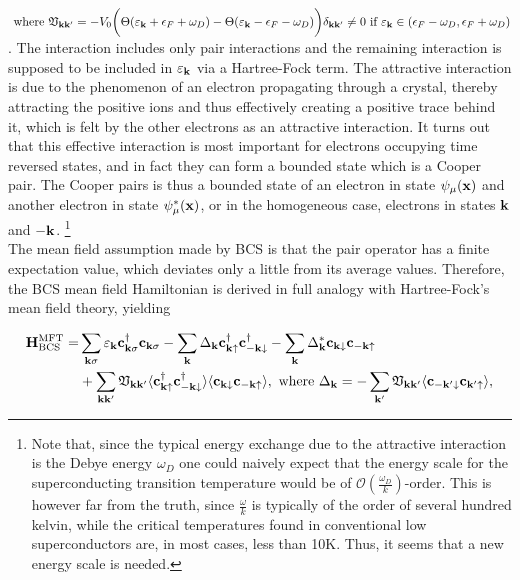 \documentclass{homework}
\begin{document}
$\textnormal{ where } {\mathfrak{V}}_{{\bf k}{\bf k}'} = -V_0 \bigg(\Theta(\varepsilon_{\bf k} + \epsilon_F + \omega_D) - \Theta(\varepsilon_{\bf k} - \epsilon_F - \omega_D)\bigg) \delta_{{\bf k}{\bf k}'} \neq 0 \textnormal{ if }\varepsilon_{{\bf k}} \in (\epsilon_F - \omega_D, \epsilon_F + \omega_D)$. The interaction includes only pair interactions and the remaining interaction is supposed to be included in $\varepsilon_{{\bf k}}$ via a Hartree-Fock term. The attractive interaction is due to the phenomenon of an electron propagating through a crystal, thereby attracting the positive ions and thus effectively creating a positive trace behind it, which is felt by the other electrons as an attractive interaction. It turns out that this effective interaction is most important for electrons occupying time reversed states, and in fact they can form a bounded state which is a Cooper pair. The Cooper pairs is thus a bounded state of an electron in state $\psi_{\mu}({\bf x})$ and another electron in state $\psi_{\mu}^*({\bf x})$, or in the homogeneous case, electrons in states ${\bf k}$ and ${\bf -k}$. \footnote{Note that, since the typical energy exchange due to the attractive interaction is the Debye energy $\omega_D$ one could naively expect that the energy scale for the superconducting transition temperature would be of $\mathcal{O}(\frac{\omega_D}{k})$-order. This is however far from the truth, since $\frac{\omega}{k}$ is typically of the order of several hundred kelvin, while the critical temperatures found in conventional low superconductors are, in most cases, less than 10K. Thus, it seems that a new energy scale is needed. }\\ 

The mean field assumption made by BCS is that the pair operator has a finite expectation value, which deviates only a little from its average values. Therefore, the BCS mean field Hamiltonian is derived in full analogy with Hartree-Fock's mean field theory, yielding

\begin{equation}
    \begin{split}
        {\bf H}_{\textnormal{BCS}}^{\textnormal{MFT}} =& \sum_{{\bf k} \sigma} \varepsilon_{{\bf k}} {\bf c}_{{\bf k} \sigma}^\dagger {\bf c}_{{\bf k} \sigma} - \sum_{{\bf k}} \Delta_{{\bf k}} {\bf c}_{{\bf k} \uparrow}^\dagger {\bf c}_{-{\bf k} \downarrow}^\dagger - \sum_{{\bf k}} \Delta^*_{{\bf k}} {\bf c}_{{\bf k} \downarrow} {\bf c}_{-{\bf k} \uparrow} \\
        &+ \sum_{{\bf k}{\bf k}'} \mathfrak{V}_{{\bf k}{\bf k}'} \langle {\bf c}_{{\bf k} \uparrow}^\dagger {\bf c}_{-{\bf k} \downarrow}^\dagger \rangle \langle {\bf c}_{{\bf k} \downarrow} {\bf c}_{-{\bf k} \uparrow} \rangle, \textnormal{ where } \Delta_{{\bf k}} = - \sum_{{\bf k'}} \mathfrak{V}_{{\bf k} {\bf k'}} \langle  {\bf c}_{-{\bf k}' \downarrow} {\bf c}_{{\bf k}' \uparrow} \rangle,
        \label{BCS hamiltonian}
    \end{split}
\end{equation}
\end{document}
